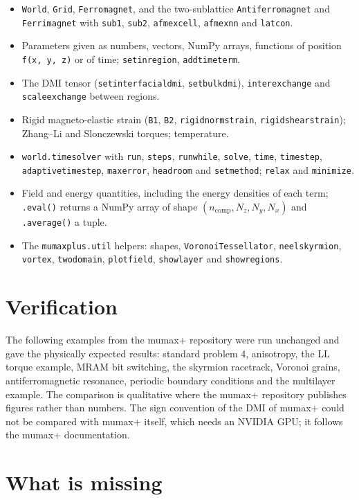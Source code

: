 \documentclass[11pt,a4paper,oneside]{book}
\newcommand{\code}[1]{\texttt{#1}}
\renewcommand{\_}{\textunderscore\allowbreak}
\begin{document}
\begin{itemize}
\item \code{World}, \code{Grid}, \code{Ferromagnet}, and the two-sublattice \code{Antiferromagnet} and
\code{Ferrimagnet} with \code{sub1}, \code{sub2}, \code{afmex\_cell}, \code{afmex\_nn} and \code{latcon}.
\item Parameters given as numbers, vectors, NumPy arrays, functions of position \code{f(x, y, z)} or of time;
\code{set\_in\_region}, \code{add\_time\_term}.
\item The DMI tensor (\code{set\_interfacial\_dmi}, \code{set\_bulk\_dmi}), \code{inter\_exchange} and
\code{scale\_exchange} between regions.
\item Rigid magneto-elastic strain (\code{B1}, \code{B2}, \code{rigid\_norm\_strain},
\code{rigid\_shear\_strain}); Zhang--Li and Slonczewski torques; temperature.
\item \code{world.timesolver} with \code{run}, \code{steps}, \code{run\_while}, \code{solve}, \code{time},
\code{timestep}, \code{adaptive\_timestep}, \code{max\_error}, \code{headroom} and \code{set\_method};
\code{relax} and \code{minimize}.
\item Field and energy quantities, including the energy densities of each term; \code{.eval()} returns a NumPy
array of shape $(n_\text{comp}, N_z, N_y, N_x)$ and \code{.average()} a tuple.
\item The \code{mumaxplus.util} helpers: shapes, \code{VoronoiTessellator}, \code{neelskyrmion},
\code{vortex}, \code{twodomain}, \code{plot\_field}, \code{show\_layer} and \code{show\_regions}.
\end{itemize}

\section{Verification}

The following examples from the mumax+ repository were run unchanged and gave the physically expected results:
standard problem 4, anisotropy, the LL torque example, MRAM bit switching, the skyrmion racetrack, Voronoi
grains, antiferromagnetic resonance, periodic boundary conditions and the multilayer example. The comparison is
qualitative where the mumax+ repository publishes figures rather than numbers. The sign convention of the DMI of
mumax+ could not be compared with mumax+ itself, which needs an NVIDIA GPU; it follows the mumax+ documentation.

\section{What is missing}
\end{document}

